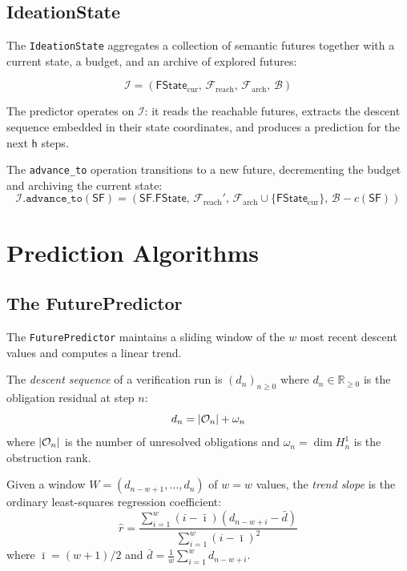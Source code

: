 \documentclass[11pt]{article}
\newcommand{\SF}{\mathsf{SF}}               %
\newcommand{\FState}{\mathsf{FState}}       %
\newcommand{\Horizon}{\mathsf{h}}           %
\newcommand{\Budget}{\mathcal{B}}           %
\newcommand{\DescentSeq}{(d_n)_{n\ge 0}}    %
\newcommand{\DescentN}{d_n}                 %
\newcommand{\DescentRate}{r}                %
\newcommand{\ObsRank}{\omega}               %
\newcommand{\HOne}{H^1}                     %
\newcommand{\WindowSize}{w}                 %
\begin{document}
\subsection{IdeationState}

The \texttt{IdeationState} aggregates a collection of semantic futures
together with a current state, a budget, and an archive of explored
futures:

\[
  \mathcal{I} = (\FState_{\mathrm{cur}},\, \mathcal{F}_{\mathrm{reach}},\,
                 \mathcal{F}_{\mathrm{arch}},\, \Budget)
\]

The predictor operates on $\mathcal{I}$: it reads the reachable futures,
extracts the descent sequence embedded in their state coordinates, and
produces a prediction for the next $\Horizon$ steps.

The \texttt{advance\_to} operation transitions to a new future,
decrementing the budget and archiving the current state:
\[
  \mathcal{I}.\texttt{advance\_to}(\SF) =
  (\SF.\FState,\,
   \mathcal{F}_{\mathrm{reach}}',\,
   \mathcal{F}_{\mathrm{arch}} \cup \{\FState_{\mathrm{cur}}\},\,
   \Budget - c(\SF))
\]

\section{Prediction Algorithms}\label{sec:predictor}

\subsection{The FuturePredictor}

The \texttt{FuturePredictor} maintains a sliding window of the $\WindowSize$
most recent descent values and computes a linear trend.

\begin{definition}\label{def:descent-seq}
The \emph{descent sequence} of a verification run is
$\DescentSeq$ where $\DescentN \in \mathbb{R}_{\ge 0}$ is the
obligation residual at step $n$:
\[
  \DescentN = |\oblig_n| + \ObsRank_n
\]
where $|\mathcal{O}_n|$ is the number of unresolved obligations and
$\ObsRank_n = \dim \HOne_n$ is the obstruction rank.
\end{definition}

\begin{definition}\label{def:trend}
Given a window $W = (d_{n-w+1}, \ldots, d_n)$ of $\WindowSize = w$ values,
the \emph{trend slope} is the ordinary least-squares regression
coefficient:
\[
  \hat{\DescentRate} = \frac{\sum_{i=1}^{w} (i - \bar\imath)(d_{n-w+i} - \bar d)}
                            {\sum_{i=1}^{w} (i - \bar\imath)^2}
\]
where $\bar\imath = (w+1)/2$ and $\bar d = \frac{1}{w}\sum_{i=1}^{w} d_{n-w+i}$.
\end{definition}
\end{document}
